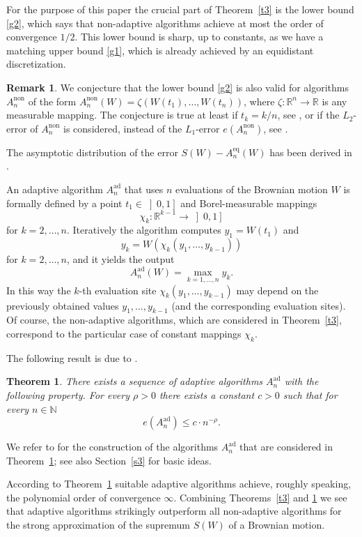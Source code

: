 \documentclass[a4paper]{amsart}
\theoremstyle{definition}
\newtheorem{rem}[exmp]{Remark}
\theoremstyle{plain}
\newtheorem{thm}[exmp]{Theorem}
\newcommand{\N}{\mathbb N}
\newcommand{\R}{\mathbb R}
\newcommand{\adap}{\ensuremath{ \mathrm{ad} }}
\newcommand{\equi}{\ensuremath{ \mathrm{eq} }}
\newcommand{\non}{\ensuremath{ \mathrm{non} }}
\begin{document}
For the purpose of this paper the crucial part of
Theorem~\ref{t3} is the
lower bound \eqref{g2}, which says that non-adaptive algorithms achieve at
most the order of convergence $1/2$. This lower bound is sharp, up to
constants, as we have a matching upper bound \eqref{g1}, which is already
achieved by an equidistant discretization.

\begin{rem}\label{r4}
We conjecture that the lower bound \eqref{g2} is also valid for algorithms
$A^\non_n$ of the form $A^\non_n(W)=\zeta(W(t_1),\dots, W(t_n))$,
where $\zeta\colon \R^n\to\R$ is any measurable mapping.
The conjecture is true at least if $t_{k}=k/n$, see
\citet*[Prop.~2.1 and proof of Thm.~3.3]{MR3744680}, or if the
$L_2$-error of $A^\non_n$ is considered, instead of the $L_1$-error
$e(A^\non_n)$, see \citet*[beginning of proof of Thm.~2.1]{Calvin2004}.

The asymptotic distribution of the error $S(W) - A_n^\equi
(W)$ has been derived in \citet*[Thm.~1]{MR1384357}.
\end{rem}

An adaptive algorithm $A^\adap_n$ that uses $n$ evaluations of the
Brownian motion $W$ is formally defined by a point
$t_1 \in \left]0,1\right]$ and Borel-measurable mappings
\[
\chi_k \colon \R^{k-1} \to \left]0,1\right]
\]
for $k=2,\dots,n$. Iteratively the algorithm computes
$y_1 = W(t_1)$ and
\[
y_k = W (\chi_k(y_1,\dots,y_{k-1}))
\]
for $k=2,\dots,n$, and it yields the output
\[
A^\adap_n (W) = \max_{k=1,\dots,n} y_{k}.
\]
In this way the $k$-th evaluation site
$\chi_k(y_1,\dots,y_{k-1})$ may depend on the previously
obtained values $y_1,\dots,y_{k-1}$ (and the corresponding evaluation
sites).
Of course, the non-adaptive algorithms, which are considered in
Theorem~\ref{t3}, correspond to the particular case of constant mappings
$\chi_k$.

The following result is due to \citet*{MR3605752}.

\begin{thm}\label{t4}
There exists a sequence of adaptive algorithms $A_n^\adap$ with the
following property. For every $\rho > 0$ there exists a constant
$c > 0$ such that for every $n \in \N$
\[
e(A^\adap_n) \leq c \cdot n^{-\rho}.
\]
\end{thm}

We refer to \citet*{MR3605752} for the construction of the algorithms
$A^\adap_n$ that are considered in Theorem~\ref{t4};
see also Section~\ref{s3} for basic ideas.

According to Theorem~\ref{t4} suitable adaptive algorithms achieve,
roughly speaking, the polynomial order of convergence $\infty$.
Combining Theorems~\ref{t3} and \ref{t4} we see that adaptive algorithms
strikingly outperform all non-adaptive algorithms for the
strong approximation of the supremum $S(W)$ of a Brownian motion.
\end{document}
